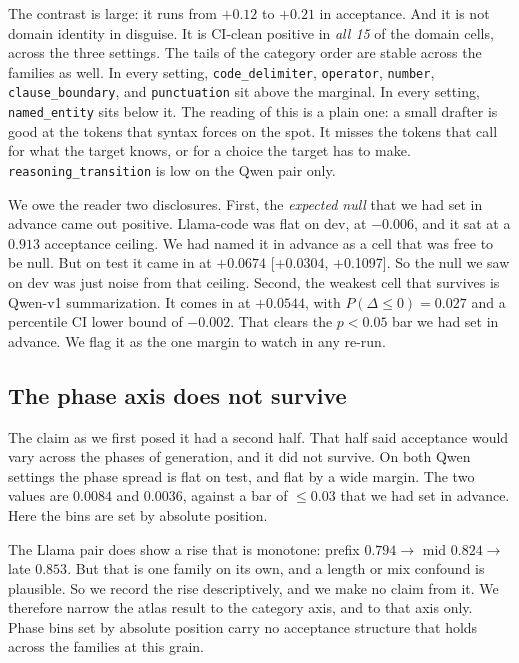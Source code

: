 \documentclass[11pt]{article}
\newcommand{\pdle}{\ensuremath{P(\Delta\le 0)}}
\begin{document}
The contrast is large: it runs from $+0.12$ to $+0.21$ in acceptance. And it
is not domain identity in disguise. It is CI-clean positive in \emph{all 15}
of the domain cells, across the three settings. The tails of the category
order are stable across the families as well. In every setting,
\texttt{code\_delimiter}, \texttt{operator}, \texttt{number},
\texttt{clause\_boundary}, and \texttt{punctuation} sit above the marginal. In
every setting, \texttt{named\_entity} sits below it. The reading of this is a
plain one: a small drafter is good at the tokens that syntax forces on the
spot. It misses the tokens that call for what the target knows, or for a
choice the target has to make. \texttt{reasoning\_transition} is low on the
Qwen pair only.

We owe the reader two disclosures. First, the \emph{expected null} that we had
set in advance came out positive. Llama-code was flat on dev, at $-0.006$, and
it sat at a $0.913$ acceptance ceiling. We had named it in advance as a cell
that was free to be null. But on test it came in at $+0.0674$
{\footnotesize[+0.0304, +0.1097]}. So the null we saw on dev was just noise
from that ceiling. Second, the weakest cell that survives is Qwen-v1
summarization. It comes in at $+0.0544$, with $\pdle=0.027$ and a percentile
CI lower bound of $-0.002$. That clears the $p<0.05$ bar we had set in
advance. We flag it as the one margin to watch in any re-run.

\subsection{The phase axis does not survive}
\label{sec:atlas-phase}

The claim as we first posed it had a second half. That half said acceptance
would vary across the phases of generation, and it did not survive. On both
Qwen settings the phase spread is flat on test, and flat by a wide margin. The
two values are $0.0084$ and $0.0036$, against a bar of $\le 0.03$ that we had
set in advance. Here the bins are set by absolute position.

The Llama pair does show a rise that is monotone: prefix $0.794 \to$ mid
$0.824 \to$ late $0.853$. But that is one family on its own, and a length or
mix confound is plausible. So we record the rise descriptively, and we make no
claim from it. We therefore narrow the atlas result to the category axis, and
to that axis only. Phase bins set by absolute position carry no acceptance
structure that holds across the families at this grain.
\end{document}
